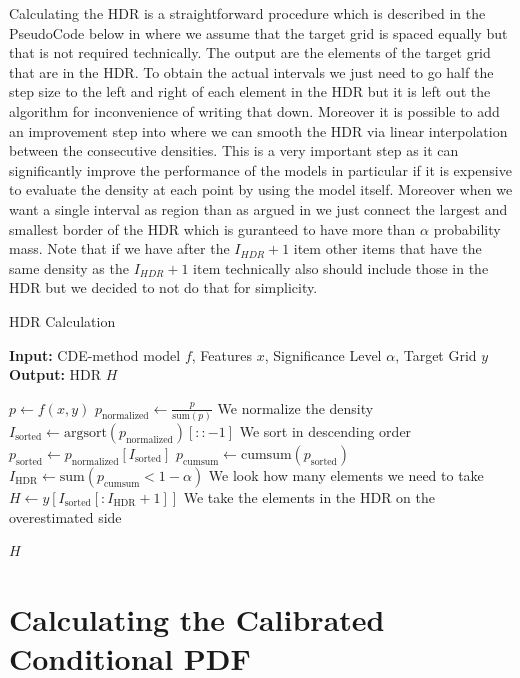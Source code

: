 Calculating the HDR is a straightforward procedure which is described in the PseudoCode below in  where we assume that the target grid is spaced equally but that is not required technically. The output are the elements of the target grid that are in the HDR. To obtain the actual intervals we just need to go half the step size to the left and right of each element in the HDR but it is left out the algorithm for inconvenience of writing that down. Moreover it is possible to add an improvement step into  where we can smooth the HDR via linear interpolation between the consecutive densities. This is a very important step as it can significantly improve the performance of the models in particular if it is expensive to evaluate the density at each point by using the model itself. Moreover when we want a single interval as region than as argued in  we just connect the largest and smallest border of the HDR which is guranteed to have more than $\alpha$ probability mass. Note that if we have after the $I_{HDR} + 1$ item other items that have the same density as the $I_{HDR} + 1$ item technically also should include those in the HDR but we decided to not do that for simplicity.

\begin{algorithm}
    \caption{HDR Calculation}
    \label{alg:hdr}
    \begin{algorithmic}
        \STATE \textbf{Input:} CDE-method model $f$, Features $x$, Significance Level $\alpha$, Target Grid $y$
        \STATE \textbf{Output:} HDR $H$

        \STATE $p \leftarrow f(x, y)$
        \STATE $p_{\text{normalized}} \leftarrow \frac{p}{\text{sum}(p)}$ We normalize the density
        \STATE $I_{\text{sorted}} \leftarrow \text{argsort}(p_{\text{normalized}})[::-1]$ We sort in descending order
        \STATE $p_{\text{sorted}} \leftarrow p_{\text{normalized}}[I_{\text{sorted}}]$
        \STATE $p_{\text{cumsum}} \leftarrow \text{cumsum}(p_{\text{sorted}})$
        \STATE $I_{\text{HDR}} \leftarrow \text{sum}(p_{\text{cumsum}} < 1 - \alpha)$ We look how many elements we need to take
        \STATE $H \leftarrow y[I_{\text{sorted}}[:I_{\text{HDR}} + 1]]$ We take the elements in the HDR on the overestimated side

        \RETURN $H$
    \end{algorithmic}
\end{algorithm}

\section{Calculating the Calibrated Conditional PDF}


